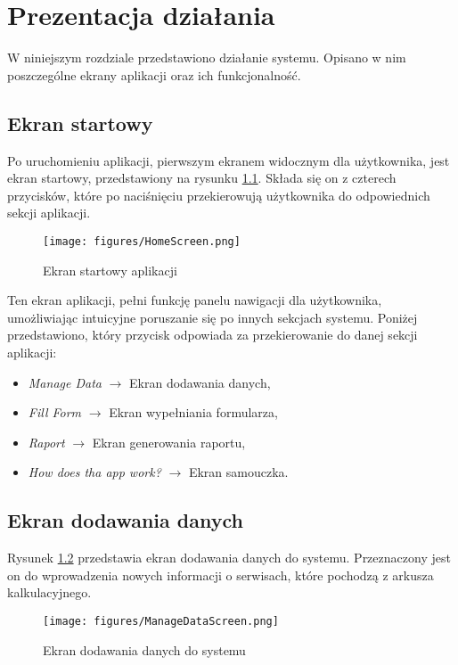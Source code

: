 \chapter{Prezentacja działania}

W niniejszym rozdziale przedstawiono działanie systemu. Opisano w nim poszczególne ekrany aplikacji oraz ich funkcjonalność.

\section{Ekran startowy}
Po uruchomieniu aplikacji, pierwszym ekranem widocznym dla użytkownika, jest ekran startowy, przedstawiony na rysunku \ref{fig:homescreen}. Składa się on z czterech przycisków, które po naciśnięciu przekierowują użytkownika do odpowiednich sekcji aplikacji.

\begin{figure}[h]
    \centering
    \texttt{[image: figures/HomeScreen.png]}
    \caption{Ekran startowy aplikacji}
    \label{fig:homescreen}
\end{figure}

Ten ekran aplikacji, pełni funkcję panelu nawigacji dla użytkownika, umożliwiając intuicyjne poruszanie się po innych sekcjach systemu.
Poniżej przedstawiono, który przycisk odpowiada za przekierowanie do danej sekcji aplikacji:
\begin{itemize}
    \item \emph{Manage Data} $\rightarrow$ Ekran dodawania danych,
    \item \emph{Fill Form} $\rightarrow$ Ekran wypełniania formularza,
    \item \emph{Raport} $\rightarrow$ Ekran generowania raportu,
    \item \emph{How does tha app work?} $\rightarrow$ Ekran samouczka.
\end{itemize}


\section{Ekran dodawania danych}
Rysunek \ref{fig:managedatascreen} przedstawia ekran dodawania danych do systemu. Przeznaczony jest on do wprowadzenia nowych informacji o serwisach, które pochodzą z arkusza kalkulacyjnego.
\begin{figure}[H]
    \centering
    \texttt{[image: figures/ManageDataScreen.png]}
    \caption{Ekran dodawania danych do systemu}
    \label{fig:managedatascreen}
\end{figure}

